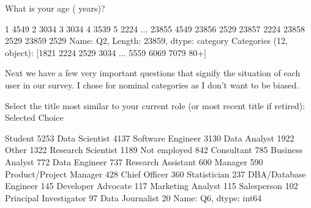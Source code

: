 \documentclass[letterpaper,10pt,english]{jupyterBook}
\begin{document}
\begin{sphinxVerbatim}[commandchars=\\\{\}]
What is your age (\PYGZsh{} years)?
\end{sphinxVerbatim}

\begin{sphinxVerbatim}[commandchars=\\\{\}]
1        45\PYGZhy{}49
2        30\PYGZhy{}34
3        30\PYGZhy{}34
4        35\PYGZhy{}39
5        22\PYGZhy{}24
         ...  
23855    45\PYGZhy{}49
23856    25\PYGZhy{}29
23857    22\PYGZhy{}24
23858    25\PYGZhy{}29
23859    25\PYGZhy{}29
Name: Q2, Length: 23859, dtype: category
Categories (12, object): [\PYGZsq{}18\PYGZhy{}21\PYGZsq{} \PYGZlt{} \PYGZsq{}22\PYGZhy{}24\PYGZsq{} \PYGZlt{} \PYGZsq{}25\PYGZhy{}29\PYGZsq{} \PYGZlt{} \PYGZsq{}30\PYGZhy{}34\PYGZsq{} ... \PYGZsq{}55\PYGZhy{}59\PYGZsq{} \PYGZlt{} \PYGZsq{}60\PYGZhy{}69\PYGZsq{} \PYGZlt{} \PYGZsq{}70\PYGZhy{}79\PYGZsq{} \PYGZlt{} \PYGZsq{}80+\PYGZsq{}]
\end{sphinxVerbatim}

\sphinxAtStartPar
Next we have a few very important questions that signify the situation of each user in our survey. I chose for nominal categories as I don’t want to be biased.

\begin{sphinxVerbatim}[commandchars=\\\{\}]
\end{sphinxVerbatim}

\begin{sphinxVerbatim}[commandchars=\\\{\}]
Select the title most similar to your current role (or most recent title if retired): \PYGZhy{} Selected Choice
\end{sphinxVerbatim}

\begin{sphinxVerbatim}[commandchars=\\\{\}]
Student                    5253
Data Scientist             4137
Software Engineer          3130
Data Analyst               1922
Other                      1322
Research Scientist         1189
Not employed                842
Consultant                  785
Business Analyst            772
Data Engineer               737
Research Assistant          600
Manager                     590
Product/Project Manager     428
Chief Officer               360
Statistician                237
DBA/Database Engineer       145
Developer Advocate          117
Marketing Analyst           115
Salesperson                 102
Principal Investigator       97
Data Journalist              20
Name: Q6, dtype: int64
\end{sphinxVerbatim}
\end{document}
